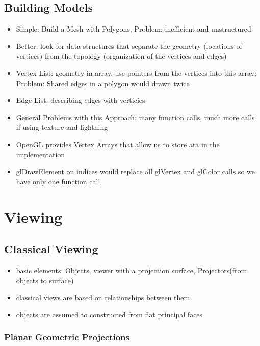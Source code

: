 \documentclass[11pt,a4paper]{article}
\begin{document}
	\subsection{Building Models}
	\begin{itemize}
		\item Simple: Build a Mesh with Polygons, Problem: inefficient and unstructured
		\item Better: look for data structures that separate the geometry (locations of vertices) from the topology (organization of the vertices and edges)
		\item Vertex List: geometry in array, use pointers from the vertices into this array; Problem: Shared edges in a polygon would drawn twice
		\item Edge List: describing edges with verticies
		\item General Problems with this Approach: many function calls, much more calls if using texture and lightning
		\item OpenGL provides Vertex Arrays that allow us to store ata in the implementation 
		\item glDrawElement on indices would replace all glVertex and glColor calls so we have only one function call
	\end{itemize}
\section{Viewing}
	 \subsection{Classical Viewing}
	\begin{itemize}
		\item basic elements: Objects, viewer with a projection surface, Projectors(from objects to surface)
		\item classical views are based on relationships between them
		\item objects are assumed to constructed from flat principal faces
	\end{itemize}
	\subsubsection{Planar Geometric Projections}
\end{document}
